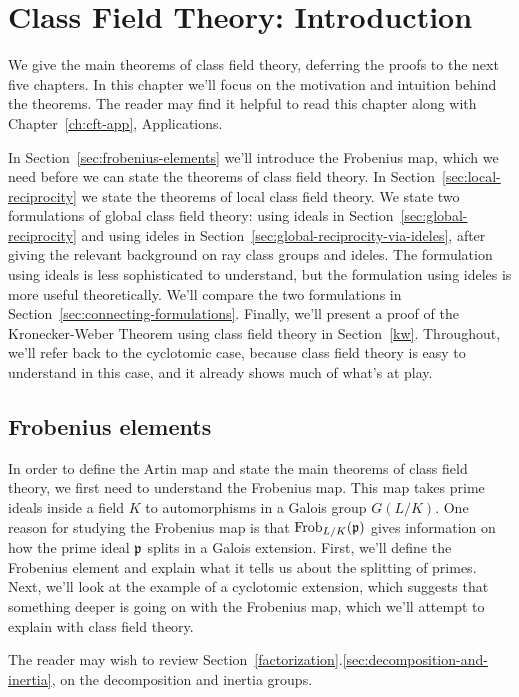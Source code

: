 \chapter{Class Field Theory: Introduction}
We give the main theorems of class field theory, deferring the proofs to the next five chapters. In this chapter we'll focus on the motivation and intuition behind the theorems. The reader may find it helpful to read this chapter along with Chapter~\ref{ch:cft-app}, Applications.

In Section~\ref{sec:frobenius-elements} we'll introduce the Frobenius map, which we need before we can state the theorems of class field theory. In Section~\ref{sec:local-reciprocity} we state the theorems of local class field theory. We state two formulations of global class field theory: using ideals in Section~\ref{sec:global-reciprocity} and using ideles in Section~\ref{sec:global-reciprocity-via-ideles}, after giving the relevant background on ray class groups and ideles. The formulation using ideals is less sophisticated to understand, but the formulation using ideles is more useful theoretically. We'll compare the two formulations in Section~\ref{sec:connecting-formulations}. Finally, we'll present a proof of the Kronecker-Weber Theorem using class field theory in Section~\ref{kw}. Throughout, we'll refer back to the cyclotomic case, because class field theory is easy to understand in this case, and it already shows much of what's at play.
\section{Frobenius elements}
In order to define the Artin map and state the main theorems of class field theory, we first need to understand the Frobenius map. This map takes prime ideals inside a field $K$ to automorphisms in a Galois group $G(L/K)$. One reason for studying the Frobenius map is that $\operatorname{Frob}_{L/K}(\mathfrak{p})$ gives information on how the prime ideal $\mathfrak{p}$ splits in a Galois extension. First, we'll define the Frobenius element and explain what it tells us about the splitting of primes. Next, we'll look at the example of a cyclotomic extension, which suggests that something deeper is going on with the Frobenius map, which we'll attempt to explain with class field theory.

The reader may wish to review Section~\ref{factorization}.\ref{sec:decomposition-and-inertia}, on the decomposition and inertia groups.

